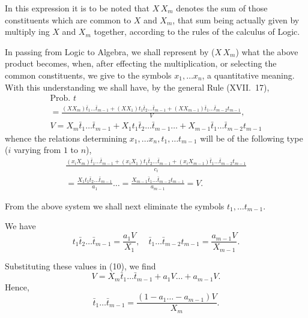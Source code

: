 \documentclass[oneside]{book}
\begin{document}
In this expression it is to be noted that $X\,X_m$ denotes the sum
of those constituents which are common to $X$ and $X_m$, that sum
being actually given by multiply ing $X$ and $X_m$ together, according
to the rules of the calculus of Logic.

In passing from Logic to Algebra, we shall represent by
($X\,X_m$) what the above product becomes, when, after effecting
the multiplication, or selecting the common constituents, we
give to the symbols $x_1, \dotsc x_n$, a quantitative meaning.
With this understanding we shall have, by the general Rule
(XVII.~17),
\begin{gather*}
  \text{Prob. }t
\\
= \frac{ (X X_m)    \bar{t}_1\dotsc \bar{t}_{m-1}
       + (X X_1)t_1 \bar{t}_2\dotsc \bar{t}_{m-1}
       + (X X_{m-1})\bar{t}_1\dotsc \bar{t}_{m-2} t_{m-1}
       }{V},                                               \tag{9}
\\
  V = X_m     \bar{t}_1\dotsc \bar{t}_{m-1}
    + X_1 t_1 \bar{t}_2\dotsc \bar{t}_{m-1} \dotsc
    + X_{m-1} \bar{t}_1\dotsc \bar{t}_{m-2} t_{m-1}       \tag{10}
\end{gather*}
whence the relations determining
$x_1, \dotsc x_n, t_1, \dotsc t_{m-1}$ will be of
the following type ($i$ varying from $1$ to $n$),
\begin{gather*}
  \frac{ (x_i X_m)    \bar{t}_1\dotsc \bar{t}_{m-1}
       + (x_i X_1)t_1 \bar{t}_2\dotsc \bar{t}_{m-1}
       + (x_i X_{m-1})\bar{t}_1\dotsc \bar{t}_{m-2} t_{m-1}
       }{c_i}
\\
= \frac{ X_1 t_1 \bar{t}_2\dotsc \bar{t}_{m-1} }{a_1} \dotso
= \frac{ X_{m-1} \bar{t}_1\dotsc \bar{t}_{m-2} t_{m-1}}{a_{m-1}}
= V.         \tag{11}
\end{gather*}

From the above system we shall next eliminate the symbols
$t_1, \dotsc t_{m-1}$.

We have
\[
  t_1 \bar{t}_2\dotsc \bar{t}_{m-1} = \frac{a_1V}{X_1},\quad
  \bar{t}_1\dotsc \bar{t}_{m-2} t_{m-1} = \frac{a_{m-1}V}{X_{m-1}}.
\tag{12}
\]

Substituting these values in (10), we find
\[
  V = X_m \bar{t}_1 \dotsc \bar{t}_{m-1} + a_1 V \dotsc + a_{m-1} V.
\]
Hence,
\[
  \bar{t}_1 \dotsc \bar{t}_{m-1}
= \frac{(1 - a_1 \dotsc - a_{m-1})V}{X_m}.
\]
\end{document}
